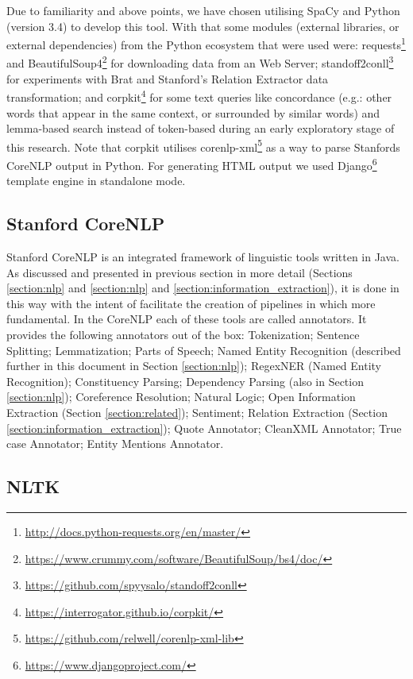 \documentclass[11pt,a4paper,openright]{memoir}
\begin{document}
Due to familiarity and above points, we have chosen utilising SpaCy and Python (version 3.4) to develop this tool. With that some modules (external libraries, or external dependencies) from the Python ecosystem that were used were: requests\footnote{\url{http://docs.python-requests.org/en/master/}} and BeautifulSoup4\footnote{\url{https://www.crummy.com/software/BeautifulSoup/bs4/doc/}} for downloading data from an Web Server; standoff2conll\footnote{\url{https://github.com/spyysalo/standoff2conll}} for experiments with Brat and Stanford's Relation Extractor data transformation; and corpkit\footnote{\url{https://interrogator.github.io/corpkit/}} for some text queries like concordance (e.g.: other words that appear in the same context, or surrounded by similar words) and lemma-based search instead of token-based during an early exploratory stage of this research. Note that corpkit utilises corenlp-xml\footnote{\url{https://github.com/relwell/corenlp-xml-lib}} as a way to parse Stanfords CoreNLP output in Python. For generating HTML output we used Django\footnote{\url{https://www.djangoproject.com/}} template engine in standalone mode.

\subsection{Stanford CoreNLP}

Stanford CoreNLP \cite{manning-EtAl:2014:P14-5} is an integrated framework of linguistic tools written in Java. As discussed and presented in previous section in more detail (Sections \ref{section:nlp} and \ref{section:nlp} and \ref{section:information_extraction}), it is done in this way with the intent of facilitate the creation of pipelines in which more fundamental. In the CoreNLP each of these tools are called annotators. It provides the following annotators out of the box: Tokenization; Sentence Splitting; Lemmatization; Parts of Speech; Named Entity Recognition (described further in this document in Section \ref{section:nlp}); RegexNER (Named Entity Recognition); Constituency Parsing; Dependency Parsing (also in Section \ref{section:nlp}); Coreference Resolution; Natural Logic; Open Information Extraction (Section \ref{section:related}); Sentiment; Relation Extraction (Section \ref{section:information_extraction}); Quote Annotator; CleanXML Annotator; True case Annotator; Entity Mentions Annotator.

\subsection{NLTK}
\end{document}
